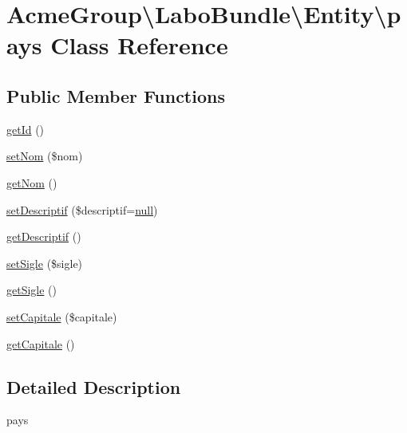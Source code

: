 \hypertarget{class_acme_group_1_1_labo_bundle_1_1_entity_1_1pays}{\section{Acme\+Group\textbackslash{}Labo\+Bundle\textbackslash{}Entity\textbackslash{}pays Class Reference}
\label{class_acme_group_1_1_labo_bundle_1_1_entity_1_1pays}
}
\subsection*{Public Member Functions}
\begin{DoxyCompactItemize}
\item 
\hyperlink{class_acme_group_1_1_labo_bundle_1_1_entity_1_1pays_a090332d665601a8414b7044cd95e2deb}{get\+Id} ()
\item 
\hyperlink{class_acme_group_1_1_labo_bundle_1_1_entity_1_1pays_ab2c348f28cd5fb6fdc697e413221b3f6}{set\+Nom} (\$nom)
\item 
\hyperlink{class_acme_group_1_1_labo_bundle_1_1_entity_1_1pays_a8d1d87a0b31c06c6a5a7c293d043de02}{get\+Nom} ()
\item 
\hyperlink{class_acme_group_1_1_labo_bundle_1_1_entity_1_1pays_a3438cca9e36f12ca6533356acd53944e}{set\+Descriptif} (\$descriptif=\hyperlink{validate_8js_afb8e110345c45e74478894341ab6b28e}{null})
\item 
\hyperlink{class_acme_group_1_1_labo_bundle_1_1_entity_1_1pays_a688d070b40fb4784a3a76919c6218ae0}{get\+Descriptif} ()
\item 
\hyperlink{class_acme_group_1_1_labo_bundle_1_1_entity_1_1pays_ae53625af746992e6a8953951d0ec71e8}{set\+Sigle} (\$sigle)
\item 
\hyperlink{class_acme_group_1_1_labo_bundle_1_1_entity_1_1pays_a2cebf811cf0edc80047a053387171b3f}{get\+Sigle} ()
\item 
\hyperlink{class_acme_group_1_1_labo_bundle_1_1_entity_1_1pays_a8466f1d47562be4240422e53bd126938}{set\+Capitale} (\$capitale)
\item 
\hyperlink{class_acme_group_1_1_labo_bundle_1_1_entity_1_1pays_a695018aba5b0fbf069cb816195bab2f2}{get\+Capitale} ()
\end{DoxyCompactItemize}


\subsection{Detailed Description}
pays

